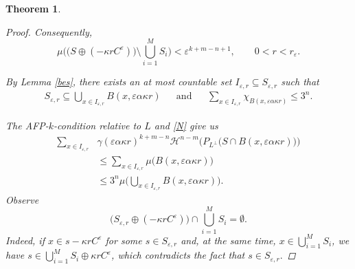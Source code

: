 \documentclass[pdflatex,sn-mathphys-num]{sn-jnl}
\theoremstyle{plain}
\newtheorem{theorem}{Theorem}[section]
\theoremstyle{definition}
\begin{document}
\begin{theorem}
\begin{proof}
Consequently, $$\mu\Big(\big(S\oplus (-\kappa rC^{\varepsilon})\big)\setminus \bigcup_{i=1}^M S_i\Big)<\varepsilon^{k+m-n+1},\qquad 0<r<r_{\varepsilon}.$$


      By Lemma \ref{bes}, there exists an at most countable set $I_{\varepsilon, r}\subseteq S_{\varepsilon, r}$ such that \begin{align}\label{N}
              S_{\varepsilon, r}\subseteq\bigcup_{x\in I_{\varepsilon, r}} B(x, \varepsilon\alpha\kappa r)&&\text{and}&&\sum_{x\in I_{\varepsilon, r}}\chi_{B(x, \varepsilon\alpha\kappa r)}\leq 3^n.
      \end{align} 
      
        The AFP-$k$-condition relative to $L$ and \eqref{N} give us \begin{equation}\label{eq7}
            \begin{split}
                \sum_{x\in I_{\varepsilon, r}}&\gamma(\varepsilon\alpha\kappa r)^{k+m-n}\mathcal{H}^{n-m}\Big(P_{L^{\perp}}\big(S\cap B(x, \varepsilon\alpha\kappa r)\big)\Big)\\&\leq\sum_{x\in I_{\varepsilon, r}}\mu\big(B(x, \varepsilon\alpha\kappa r)\big)\\&\leq 3^n\mu\Big(\bigcup_{x\in I_{\varepsilon, r}}B(x, \varepsilon\alpha\kappa r)\Big).\end{split}
        \end{equation}
        Observe $$\big(S_{\varepsilon, r}\oplus (-\kappa r C^{\varepsilon})\big)\cap\bigcup_{i=1}^M S_i=\emptyset.$$ Indeed, if $x\in s -\kappa r C^{\varepsilon}$ for some $s\in S_{\varepsilon, r}$ and, at the same time, $x\in\bigcup_{i=1}^M S_i$, we have $s\in \bigcup_{i=1}^M S_i\oplus \kappa r C^{\varepsilon}$, which contradicts the fact that $s\in S_{\varepsilon, r}.$


\end{proof}
\end{theorem}
\end{document}
